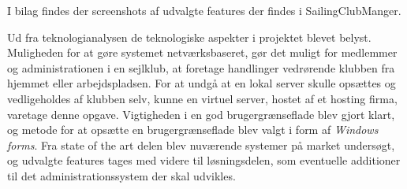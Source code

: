 I bilag  findes der screenshots af udvalgte features der findes i SailingClubManger.

Ud fra teknologianalysen de teknologiske aspekter i projektet blevet belyst. 
Muligheden for at gøre systemet netværksbaseret, gør det muligt for medlemmer og administrationen i en sejlklub, at foretage handlinger vedrørende klubben fra hjemmet eller arbejdspladsen. 
For at undgå at en lokal server skulle opsættes og vedligeholdes af klubben selv, kunne en virtuel server, hostet af et hosting firma, varetage denne opgave.
Vigtigheden i en god brugergrænseflade blev gjort klart, og metode for at opsætte en brugergrænseflade blev valgt i form af \textit{Windows forms}.
Fra state of the art delen blev nuværende systemer på market undersøgt, og udvalgte features tages med videre til løsningsdelen, som eventuelle additioner til det administrationssystem der skal udvikles.  


